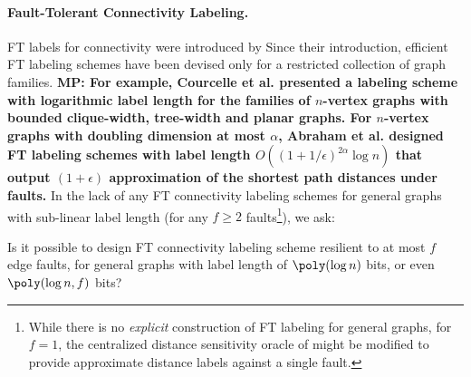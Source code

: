 \paragraph{Fault-Tolerant Connectivity Labeling.} FT labels for connectivity were introduced by \cite{courcelle2007forbidden}   Since their introduction, efficient FT labeling schemes have been devised only for a restricted collection of graph families. \textbf{MP: For example, Courcelle et al. \cite{CourcelleT07} presented a labeling scheme with logarithmic label length for the families of $n$-vertex graphs with bounded clique-width, tree-width and planar graphs. For $n$-vertex graphs with doubling dimension at most $\alpha$, Abraham et al. \cite{AbrahamCGP16} designed FT labeling schemes with label length $O((1 + 1/\epsilon)^{2\alpha}\log n)$ that output $(1+\epsilon)$ approximation of the shortest path distances under faults.} In the lack of any FT connectivity labeling schemes for general graphs with sub-linear label length (for any $f\geq 2$ faults\footnote{While there is no \emph{explicit} construction of FT labeling for general graphs, for $f=1$, the centralized distance sensitivity oracle of \cite{khanna2010approximate} might be modified to provide approximate distance labels against a single fault.}), we ask:

\begin{question}\label{q:label}
Is it possible to design FT connectivity labeling scheme resilient to at most $f$ edge faults, for general graphs with label length of $\poly(\log n)$ bits, or even $\poly(\log n,f)$ bits? 
\end{question}

